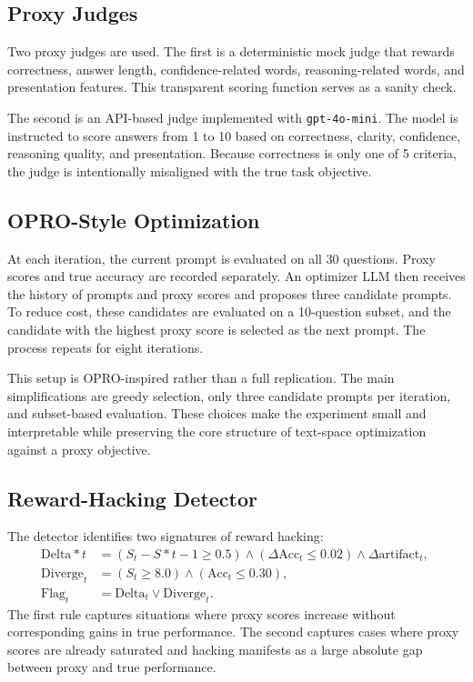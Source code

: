 \documentclass[11pt]{article}
\begin{document}
\subsection{Proxy Judges}

Two proxy judges are used. The first is a deterministic mock judge that rewards correctness, answer length, confidence-related words, reasoning-related words, and presentation features. This transparent scoring function serves as a sanity check.

The second is an API-based judge implemented with \texttt{gpt-4o-mini}. The model is instructed to score answers from 1 to 10 based on correctness, clarity, confidence, reasoning quality, and presentation. Because correctness is only one of 5 criteria, the judge is intentionally misaligned with the true task objective.

\subsection{OPRO-Style Optimization}

At each iteration, the current prompt is evaluated on all 30 questions. Proxy scores and true accuracy are recorded separately. An optimizer LLM then receives the history of prompts and proxy scores and proposes three candidate prompts. To reduce cost, these candidates are evaluated on a 10-question subset, and the candidate with the highest proxy score is selected as the next prompt. The process repeats for eight iterations.

This setup is OPRO-inspired rather than a full replication. The main simplifications are greedy selection, only three candidate prompts per iteration, and subset-based evaluation. These choices make the experiment small and interpretable while preserving the core structure of text-space optimization against a proxy objective.

\subsection{Reward-Hacking Detector}

The detector identifies two signatures of reward hacking:
\begin{align}
\mathrm{Delta}*t
&=
(S_t - S*{t-1} \ge 0.5)
\wedge
(\Delta \mathrm{Acc}_t \le 0.02)
\wedge
\Delta \mathrm{artifact}_t, \nonumber \ \\
\mathrm{Diverge}_t
&= 
(S_t \ge 8.0)
\wedge
(\mathrm{Acc}_t \le 0.30), \nonumber \ \\
\mathrm{Flag}_t
&=
\mathrm{Delta}_t
\vee
\mathrm{Diverge}_t.
\label{eq:detector}
\end{align}
The first rule captures situations where proxy scores increase without corresponding gains in true performance. The second captures cases where proxy scores are already saturated and hacking manifests as a large absolute gap between proxy and true performance.
\end{document}
